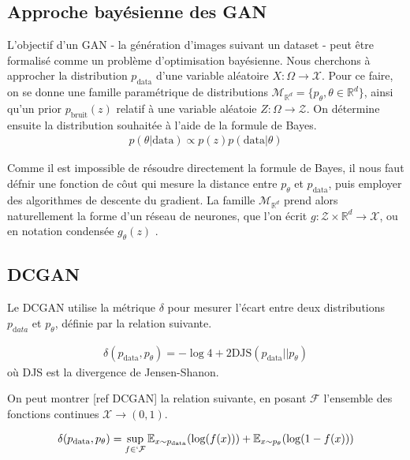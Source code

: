 \subsection{Approche bayésienne des GAN}
L'objectif d'un GAN - la génération d'images suivant un dataset - peut être formalisé comme un problème d'optimisation bayésienne. Nous cherchons à approcher la distribution $p_{\mathrm{data}}$ d'une variable aléatoire $X: \Omega \longrightarrow \mathcal{X}$. Pour ce faire, on se donne une famille paramétrique de distributions $\mathcal{M}_{\mathbb{R}^{d}} = \{p_{\theta}, \theta \in \mathbb{R}^d\}$, ainsi qu'un prior $p_{\mathrm{bruit}}(z)$ relatif à une variable aléatoie $Z : \Omega \longrightarrow \mathcal{Z}$. On détermine ensuite la distribution souhaitée à l'aide de la formule de Bayes. $$\begin{aligned} p(\theta | \mathrm{data}) \propto p(z)p(\mathrm{data}|\theta)\end{aligned}$$

Comme il est impossible de résoudre directement la formule de Bayes, il nous faut défnir une fonction de côut qui mesure la distance entre $p_{\theta}$ et $p_{\mathrm{data}}$, puis employer des algorithmes de descente du gradient. La famille $\mathcal{M}_{\mathbb{R}^d}$ prend alors naturellement la forme d'un réseau de neurones, que l'on écrit $g : \mathcal{Z} \times \mathbb{R}^{d} \longrightarrow \mathcal{X}$, ou en notation condensée $g_{\theta}(z)$ .

\subsection{DCGAN}

Le DCGAN utilise la métrique $\delta$ pour mesurer l'écart entre deux distributions $p_{\mathrm data}$ et $p_{\theta}$, définie par la relation suivante. 

$$\begin{aligned} \delta(p_{\mathrm{data}}, p_{\theta}) = -\log 4 + 2 \mathrm{DJS}(p_{\mathrm{data}} || p_{\theta})\end{aligned}$$ où DJS est la divergence de Jensen-Shanon.

On peut montrer [ref DCGAN] la relation suivante, en posant $\mathcal{F}$ l'ensemble des fonctions continues $\mathcal{X} \longrightarrow (0,1)$.

$$\begin{aligned} \delta(p_{\mathrm{data}}, p_{\theta}) = \sup_{f\in`\mathcal{F}} \mathbb{E}_{x \sim p_{\mathrm{data}}}(\log (f(x))) + \mathbb{E}_{x \sim p_{\theta}}(\log (1 - f(x)))\end{aligned}$$

